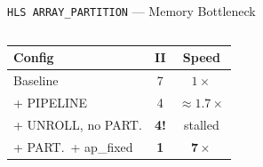 \documentclass[aspectratio=169,12pt]{beamer}
\begin{document}
\begin{frame}[fragile]{\texttt{HLS ARRAY\_PARTITION} --- Memory Bottleneck}
\begin{columns}[T,totalwidth=\textwidth]
  \vspace{8pt}
  \begin{tabular}{lcc}
    \hline
    \rowcolor{Navy!10}\textbf{Config} & \textbf{II} & \textbf{Speed}\\
    \hline
    Baseline              & 7 & $1\times$\\
    \rowcolor{Navy!5}+ PIPELINE            & 4 & ${\approx}1.7\times$\\
    + UNROLL, no PART.    & \textbf{4!} & stalled\\
    \rowcolor{Navy!5}+ PART.\ + ap\_fixed  & \textbf{\color{Teal}1} & $\mathbf{7\times}$\\
    \hline
  \end{tabular}
\end{columns}
\end{frame}
\end{document}
